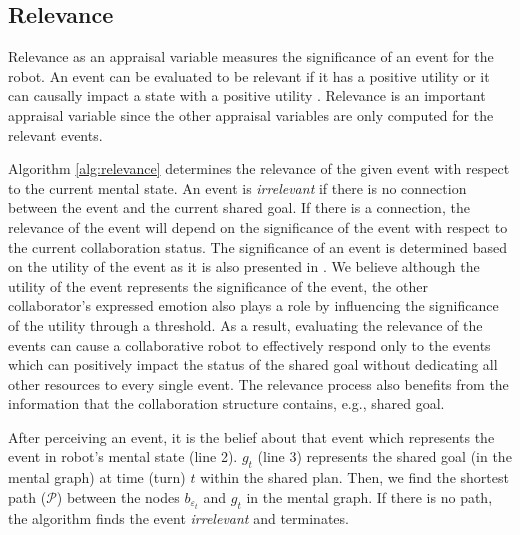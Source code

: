 \documentclass{aamas2016}
\begin{document}
\subsection{Relevance}

Relevance as an appraisal variable measures the significance of an event for the
robot. An event can be evaluated to be relevant if it has a positive utility or
it can causally impact a state with a positive utility
\cite{marsella:ema-process-model}. Relevance is an important appraisal variable
since the other appraisal variables are only computed for the relevant events.

Algorithm \ref{alg:relevance} determines the relevance of the given event with
respect to the current mental state. An event is \textit{irrelevant} if there is
no connection between the event and the current shared goal. If there is a
connection, the relevance of the event will depend on the significance of the
event with respect to the current collaboration status. The significance of an
event is determined based on the utility of the event as it is also presented in
\cite{gratch:domain-independent,marsella:ema-process-model}. We believe although
the utility of the event represents the significance of the event, the other
collaborator's expressed emotion also plays a role by influencing the
significance of the utility through a threshold. As a result, evaluating the
relevance of the events can cause a collaborative robot to effectively respond
only to the events which can positively impact the status of the shared goal
without dedicating all other resources to every single event. The relevance
process also benefits from the information that the collaboration structure
contains, e.g., shared goal.

After perceiving an event, it is the belief about that event which represents
the event in robot's mental state (line 2). $g_{t}$ (line 3) represents the
shared goal (in the mental graph) at time (turn) $t$ within the shared plan.
Then, we find the shortest path ($\mathcal{P}$) between the nodes
$\mathit{b}_{\varepsilon_t}$ and $g_{t}$ in the mental graph. If there is no
path, the algorithm finds the event \textit{irrelevant} and terminates.
\end{document}
